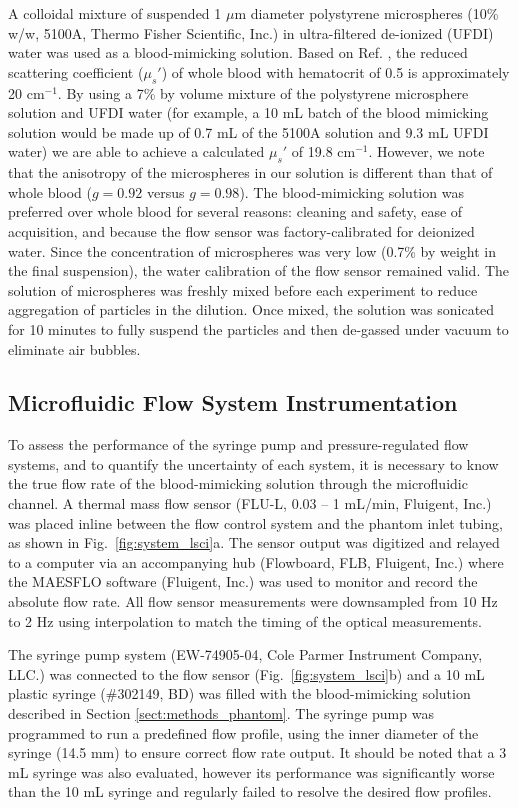 \documentclass[12pt]{spieman}
\begin{document}
\begin{spacing}{2}
A colloidal mixture of suspended 1 $\mu$m diameter polystyrene microspheres (10\% w/w, 5100A, Thermo Fisher Scientific, Inc.) in ultra-filtered de-ionized (UFDI) water was used as a blood-mimicking solution. Based on Ref. \cite[]{Roggan:1999bz}, the reduced scattering coefficient ($\mu_s'$) of whole blood with hematocrit of 0.5 is approximately 20 cm$^{-1}$. By using a 7\% by volume mixture of the polystyrene microsphere solution and UFDI water (for example, a 10 mL batch of the blood mimicking solution would be made up of 0.7 mL of the 5100A solution and 9.3 mL UFDI water) we are able to achieve a calculated $\mu_s'$ of 19.8 cm$^{-1}$. However, we note that the anisotropy of the microspheres in our solution is different than that of whole blood ($g = 0.92$ versus $g = 0.98$). The blood-mimicking solution was preferred over whole blood for several reasons: cleaning and safety, ease of acquisition, and because the flow sensor was factory-calibrated for deionized water. Since the concentration of microspheres was very low (0.7\% by weight in the final suspension), the water calibration of the flow sensor remained valid. The solution of microspheres was freshly mixed before each experiment to reduce aggregation of particles in the dilution. Once mixed, the solution was sonicated for 10 minutes to fully suspend the particles and then de-gassed under vacuum to eliminate air bubbles.


\subsection{Microfluidic Flow System Instrumentation}

To assess the performance of the syringe pump and pressure-regulated flow systems, and to quantify the uncertainty of each system, it is necessary to know the true flow rate of the blood-mimicking solution through the microfluidic channel. A thermal mass flow sensor (FLU-L, 0.03 -- 1 mL/min, Fluigent, Inc.) was placed inline between the flow control system and the phantom inlet tubing, as shown in Fig.~\ref{fig:system_lsci}a. The sensor output was digitized and relayed to a computer via an accompanying hub (Flowboard, FLB, Fluigent, Inc.) where the MAESFLO software (Fluigent, Inc.) was used to monitor and record the absolute flow rate. All flow sensor measurements were downsampled from 10 Hz to 2 Hz using interpolation to match the timing of the optical measurements.

The syringe pump system (EW-74905-04, Cole Parmer Instrument Company, LLC.) was connected to the flow sensor (Fig.~\ref{fig:system_lsci}b) and a 10 mL plastic syringe (\#302149, BD) was filled with the blood-mimicking solution described in Section \ref{sect:methods_phantom}. The syringe pump was programmed to run a predefined flow profile, using the inner diameter of the syringe (14.5 mm) to ensure correct flow rate output. It should be noted that a 3 mL syringe was also evaluated, however its performance was significantly worse than the 10 mL syringe and regularly failed to resolve the desired flow profiles.


\end{spacing}
\end{document}
